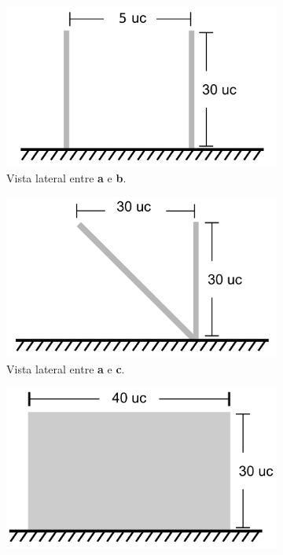 \begin{figure}[H]
    \centering
    \caption{Dimensões das paredes.}
    \label{fig:dimensoes}
    \begin{subfigure}[t]{0.328\textwidth}
        \includegraphics[width=\textwidth]{dados/figuras/dim_lateral_ab.png}
        \caption{Vista lateral entre \textbf{a} e \textbf{b}.}
        \label{fig:dim_lateral_ab}
    \end{subfigure}
    \begin{subfigure}[t]{0.328\textwidth}
        \includegraphics[width=\textwidth]{dados/figuras/dim_lateral_ac.png}
        \caption{Vista lateral entre \textbf{a} e \textbf{c}.}
        \label{fig:dim_lateral_ac}
    \end{subfigure}
    \begin{subfigure}[t]{0.328\textwidth}
        \includegraphics[width=\textwidth]{dados/figuras/dim_frontal.png}

\end{subfigure}
\end{figure}
